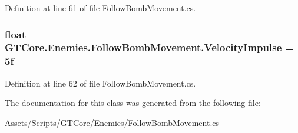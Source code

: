 Definition at line 61 of file Follow\+Bomb\+Movement.\+cs.

\hypertarget{class_g_t_core_1_1_enemies_1_1_follow_bomb_movement_a3665241c62f4b791a62f51a1e4238b8c}{}
\subsubsection[{Velocity\+Impulse}]{\setlength{\rightskip}{0pt plus 5cm}float G\+T\+Core.\+Enemies.\+Follow\+Bomb\+Movement.\+Velocity\+Impulse = 5f}\label{class_g_t_core_1_1_enemies_1_1_follow_bomb_movement_a3665241c62f4b791a62f51a1e4238b8c}


Definition at line 62 of file Follow\+Bomb\+Movement.\+cs.



The documentation for this class was generated from the following file\+:\begin{DoxyCompactItemize}
\item 
Assets/\+Scripts/\+G\+T\+Core/\+Enemies/\hyperlink{_follow_bomb_movement_8cs}{Follow\+Bomb\+Movement.\+cs}\end{DoxyCompactItemize}
